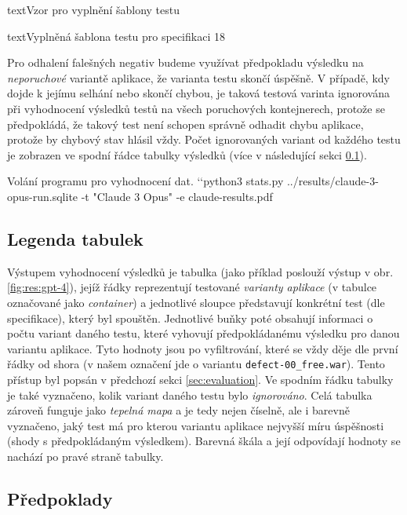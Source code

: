 \documentclass[czech, ma, kiv, he, iso690numb, pdf, viewonly]{fasthesis}
\begin{document}
\begin{code}{text}{Vzor pro vyplnění šablony testu \label{lst:template}}
{\begin{code}{text}{Vyplněná šablona testu pro specifikaci 18 \label{lst:spec18}}
{        Pro odhalení falešných negativ budeme využívat předpokladu výsledku na \emph{neporuchové} variantě aplikace, že varianta testu skončí úspěšně. V případě, kdy dojde k jejímu selhání nebo skončí chybou, je taková testová varinta ignorována při vyhodnocení výsledků testů na všech poruchových kontejnerech, protože se předpokládá, že takový test není schopen správně odhadit chybu aplikace, protože by chybový stav hlásil vždy. Počet ignorovaných variant od každého testu je zobrazen ve spodní řádce tabulky výsledků (více v následující sekci \ref{sec:plot_legend}).

        \begin{console}{Volání programu pro vyhodnocení dat. \label{lst:stats_call}}
`\uxprompt`python3 stats.py ../results/claude-3-opus-run.sqlite -t "Claude 3 Opus" -e claude-results.pdf
        \end{console}

        \subsection{Legenda tabulek} \label{sec:plot_legend}

        Výstupem vyhodnocení výsledků je tabulka (jako příklad poslouží výstup v obr. \ref{fig:res:gpt-4}), jejíž řádky reprezentují testované \textit{varianty aplikace} (v tabulce označované jako \emph{container}) a jednotlivé sloupce představují konkrétní test (dle specifikace), který byl spouštěn. Jednotlivé buňky poté obsahují informaci o počtu variant daného testu, které vyhovují předpokládanému výsledku pro danou variantu aplikace. Tyto hodnoty jsou po vyfiltrování, které se vždy děje dle první řádky od shora (v našem označení jde o variantu \verb|defect-00_free.war|). Tento přístup byl popsán v předchozí sekci \ref{sec:evaluation}. Ve spodním řádku tabulky je také vyznačeno, kolik variant daného testu bylo \emph{ignorováno}. Celá tabulka zároveň funguje jako \textit{tepelná mapa} a je tedy nejen číselně, ale i barevně vyznačeno, jaký test má pro kterou variantu aplikace nejvyšší míru úspěšnosti (shody s předpokládaným výsledkem). Barevná škála a její odpovídají hodnoty se nachází po pravé straně tabulky.

        \subsection{Předpoklady}

}
\end{code}}
\end{code}
\end{document}
